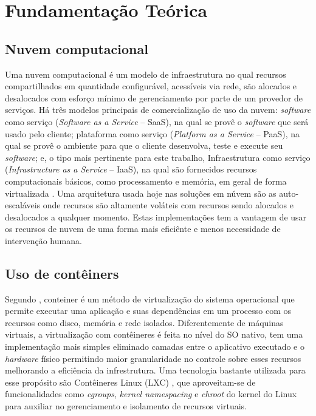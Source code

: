 \chapter{Fundamentação Teórica}
\label{chp:fundamentação}

\section{Nuvem computacional}
\label{sec:computacaonuvem}

Uma nuvem computacional é um modelo de infraestrutura no qual recursos compartilhados em quantidade configurável, acessíveis via rede, são alocados e desalocados com esforço mínimo de gerenciamento por parte de um provedor de serviços.
%
Há três modelos principais de comercialização de uso da nuvem: \textit{software} como serviço (\textit{Software as a Service} -- SaaS), na qual se provê o \textit{software} que será usado pelo cliente; plataforma como serviço (\textit{Platform as a Service} -- PaaS), na qual se provê o ambiente para que o cliente desenvolva, teste e execute seu \textit{software}; e, o tipo mais pertinente para este trabalho, Infraestrutura como serviço (\textit{Infrastructure as a Service} -- IaaS), na qual são fornecidos recursos computacionais básicos, como processamento e memória, em geral de forma virtualizada \cite{NIST2011}.
%
Uma arquitetura usada hoje nas soluções em núvem são as auto-escaláveis onde recursos são altamente voláteis com recursos sendo alocados e desalocados a qualquer momento. Estas implementações tem a vantagem de usar os recursos de nuvem de uma forma mais eficiênte e menos necessidade de intervenção humana.


\section{Uso de contêiners}
\label{sec:conteiner}

Segundo \cite{AmazonContainer}, conteiner é um método de virtualização do sistema operacional que permite executar uma aplicação e suas dependências em um processo com os recursos como disco, memória e rede isolados.
%
Diferentemente de máquinas virtuais, a virtualização com contêineres é feita no nível do SO nativo, tem uma implementação mais simples eliminado camadas entre o aplicativo executado e o \textit{hardware} físico permitindo maior granularidade no controle sobre esses recursos melhorando a eficiência da infrestrutura.
%
Uma tecnologia bastante utilizada para esse propósito são Contêineres Linux (LXC) \cite{Linuxcontainers.org2015}, que aproveitam-se de funcionalidades como \textit{cgroups}, \textit{kernel namespacing} e \textit{chroot} do kernel do Linux para auxiliar no gerenciamento e isolamento de recursos virtuais.

